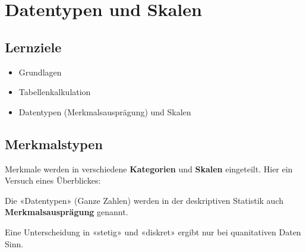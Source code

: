 
\section{Datentypen und Skalen}

\subsection*{Lernziele}

\begin{itemize}
  \item Grundlagen
  \item Tabellenkalkulation
  \item Datentypen (Merkmalsausprägung) und Skalen
\end{itemize}


\newpage
\subsection{Merkmalstypen}
Merkmale werden in verschiedene \textbf{Kategorien} und \textbf{Skalen} eingeteilt. Hier ein Versuch eines Überblickes:




Die «Datentypen» (\zB Ganze Zahlen) werden in der deskriptiven
Statistik auch \textbf{Merkmalsausprägung} genannt.
\newpage

Eine Unterscheidung in «stetig» und
«diskret» ergibt nur bei quanitativen Daten Sinn.

\newpage




